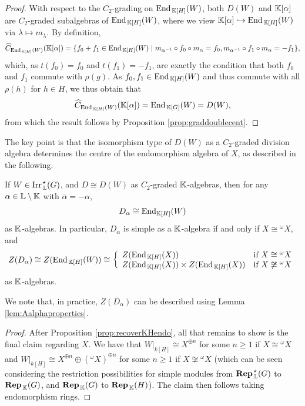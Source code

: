 \begin{proof}
    With respect to the $C_2$-grading on $\operatorname{End}_{\, {\mathbb K}[H]}(W)$, both $D(W)$ and ${\mathbb K}[\alpha]$ are $C_2$-graded subalgebras of $\operatorname{End}_{\, {\mathbb K}[H]}(W)$, where we view ${\mathbb K}[\alpha] \hookrightarrow \operatorname{End}_{\, {\mathbb K}[H]}(W)$ via $\lambda \mapsto m_{\lambda}$. By definition, 
    \[
        \widehat{C}_{\operatorname{End}_{\, {\mathbb K}[H]}(W)}({\mathbb K}[\alpha]) = \{ f_0 + f_1 \in \operatorname{End}_{\, {\mathbb K}[H]}(W) \mid m_{\alpha^{-1}} \circ f_0 \circ m_{\alpha} = f_0, m_{\alpha^{-1}} \circ f_1 \circ m_{\alpha} = -f_1\},
    \]
    which, as $t(f_0) = f_0$ and $t(f_1) = -f_1$, are exactly the condition that both $f_0$ and $f_1$ commute with $\rho(g)$. As $f_0,f_1 \in \operatorname{End}_{\, {\mathbb K}[H]}(W)$ and thus commute with all $\rho(h)$ for $h \in H$, we thus obtain that 
    \[
    \widehat{C}_{\operatorname{End}_{\, {\mathbb K}[H]}(W)}({\mathbb K}[\alpha]) = \operatorname{End}_{\, {\mathbb K}[G]}(W) = D(W),
    \]
    from which the result follows by Proposition \ref{prop:graddoublecent}.
\end{proof}

The key point is that the isomorphism type of $D(W)$ as a $C_2$-graded division algebra determines the centre of the endomorphism algebra of $X$, as described in the following.

\begin{cor}\label{cor:Dalphaisom}
If $W \in \operatorname{Irr}_{\, {\mathbb L}}^{\hspace{0.1em} \star}(G)$, and $D \cong D(W)$ as $C_2$-graded ${\mathbb K}$-algebras, then for any $\alpha \in {\mathbb L} \setminus {\mathbb K}$ with $\overline{\alpha} = - \alpha$,
\[
    D_{\alpha} \cong \operatorname{End}_{{\mathbb K}[H]}(W)
\]
as ${\mathbb K}$-algebras. In particular, $D_{\alpha}$ is simple as a ${\mathbb K}$-algebra if and only if $X \cong {}^{\omega}X$, and
\[
Z(D_{\alpha}) \cong Z(\operatorname{End}_{\, {\mathbb K}[H]}(W)) \cong \left\{ \begin{array}{ll} Z(\operatorname{End}_{\, {\mathbb K}[H]}(X)) & \mbox{if } X \cong {}^{\omega}X \\ Z(\operatorname{End}_{\, {\mathbb K}[H]}(X)) \times Z(\operatorname{End}_{\, {\mathbb K}[H]}(X)) & \mbox{if } X \not\cong {}^{\omega}X \end{array} \right.
\]
as ${\mathbb K}$-algebras.
\end{cor}

\begin{remark}
We note that, in practice, $Z(D_{\alpha})$ can be described using Lemma \ref{lem:Aalphaproperties}.
\end{remark}

\begin{proof}
    After Proposition \ref{prop:recoverKHendo}, all that remains to show is the final claim regarding $X$. We have that $W|_{k[H]} \cong X^{\oplus n}$ for some $n \geq 1$ if $X \cong {}^{\omega}X$ and $W|_{k[H]} \cong X^{\oplus n} \oplus ({}^{\omega}X)^{\oplus n}$ for some $n \geq 1$ if $X \not\cong {}^{\omega}X$ (which can be seen considering the restriction possibilities for simple modules from $\operatorname{\mathbf{Rep}}_{\, {\mathbb L}}^{\hspace{0.1em} \star}(G)$ to $\operatorname{\mathbf{Rep}}_{\, {\mathbb K}}(G)$, and $\operatorname{\mathbf{Rep}}_{\, {\mathbb K}}(G)$ to $\operatorname{\mathbf{Rep}}_{\, {\mathbb K}}(H)$). The claim then follows taking endomorphism rings.
\end{proof}

